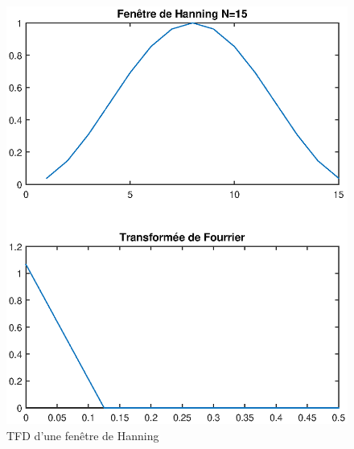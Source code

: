 \documentclass[french]{article}
\begin{document}
\begin{figure}[h!]
	\centering
	\begin{minipage}{0.45\textwidth}
		\centering
		\includegraphics[width=\textwidth]{images/hanning_tfd.eps}
		\caption{TFD d'une fenêtre de Hanning}
		\label{fig:hanning}
	\end{minipage}
	\begin{minipage}{0.45\textwidth}
		\centering

\end{minipage}
\end{figure}
\end{document}
